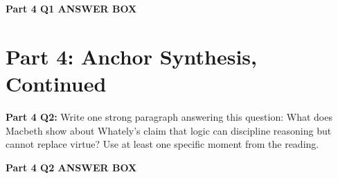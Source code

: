 \documentclass[12pt]{article}
\newcommand{\answerbox}[2]{%
\vspace{0.15em}
\noindent\textbf{#1}\par
\vspace{0.05em}
\noindent\fbox{%
\begin{minipage}[t][#2]{\dimexpr\textwidth-2\fboxsep-2\fboxrule}
\rule{\textwidth}{0pt}
\vspace{#2}
\end{minipage}
}\par
\vspace{0.25em}
}
\begin{document}
\answerbox{Part 4 Q1 ANSWER BOX}{2.0in}

\newpage

\section*{Part 4: Anchor Synthesis, Continued}

\textbf{Part 4 Q2:} Write one strong paragraph answering this question: What does Macbeth show about Whately's claim that logic can discipline reasoning but cannot replace virtue? Use at least one specific moment from the reading.

\answerbox{Part 4 Q2 ANSWER BOX}{3.0in}
\end{document}

